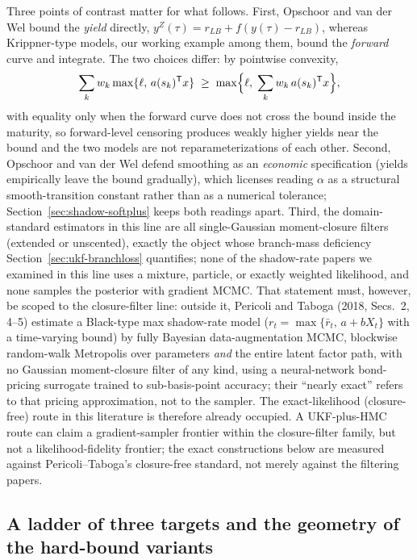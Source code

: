 \documentclass[11pt]{article}
\begin{document}
Three points of contrast matter for what follows. First, Opschoor and
van der Wel bound the \emph{yield} directly,
\(y^Z(\tau)=r_{LB}+f(y(\tau)-r_{LB})\), whereas Krippner-type models,
our working example among them, bound the \emph{forward} curve and
integrate. The two choices differ: by pointwise convexity,
\begin{equation}\label{eq:80}
 \sum_{k}w_k\max\{\ell,\,a(s_k)^{\mathsf T}x\}
 \;\geq\;
 \max\Bigl\{\ell,\;\sum_{k}w_k\,a(s_k)^{\mathsf T}x\Bigr\},
\end{equation}
with equality only when the forward curve does not cross the bound
inside the maturity, so forward-level censoring produces weakly higher
yields near the bound and the two models are not reparameterizations of
each other. Second, Opschoor and van der Wel defend smoothing as an
\emph{economic} specification (yields empirically leave the bound
gradually), which licenses reading \(\alpha\) as a structural
smooth-transition constant rather than as a numerical tolerance;
Section~\ref{sec:shadow-softplus} keeps both readings apart. Third, the
domain-standard estimators in this line are all single-Gaussian
moment-closure filters (extended or unscented), exactly the object
whose branch-mass deficiency Section~\ref{sec:ukf-branchloss} quantifies; none
of the shadow-rate papers we examined in this line uses a mixture,
particle, or exactly weighted likelihood, and none samples the
posterior with gradient MCMC. That statement must, however, be scoped
to the closure-filter line: outside it, Pericoli and Taboga (2018,
Secs.~2, 4--5) estimate a Black-type max shadow-rate model
(\(r_t=\max\{\bar r_t,\,a+bX_t\}\) with a time-varying bound) by fully
Bayesian data-augmentation MCMC, blockwise random-walk Metropolis
over parameters \emph{and} the entire latent factor path, with no
Gaussian moment-closure filter of any kind, using a neural-network
bond-pricing surrogate trained to sub-basis-point accuracy; their
``nearly exact'' refers to that pricing approximation, not to the
sampler. The exact-likelihood (closure-free) route in this literature
is therefore already occupied. A UKF-plus-HMC route can claim a
gradient-sampler frontier within the closure-filter family, but not a
likelihood-fidelity frontier; the exact constructions below are
measured against Pericoli--Taboga's closure-free standard, not merely
against the filtering papers.

\subsection{A ladder of three targets and the geometry of the
hard-bound variants}
\label{sec:shadow-ladder}
\end{document}
